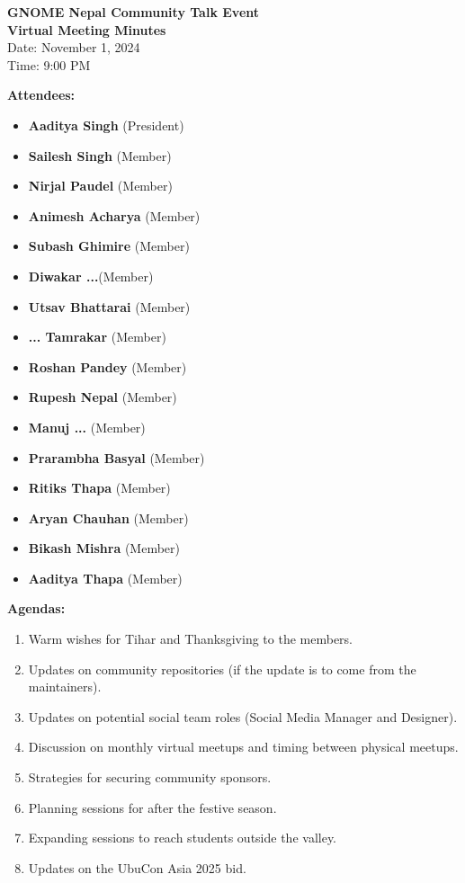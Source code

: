 \documentclass[a4paper,11pt]{article}
\begin{document}
\begin{center}
    \textbf{\Large GNOME Nepal Community Talk Event} \\[0.2cm]
    \textbf{Virtual Meeting Minutes} \\[0.2cm]
    Date: November 1, 2024 \\
    Time: 9:00 PM \\
\end{center}

\vspace{0.5cm}

\noindent\textbf{Attendees:}
\begin{itemize}
    \item \textbf{Aaditya Singh} (President)
    \item \textbf{Sailesh Singh} (Member)
    \item \textbf{Nirjal Paudel} (Member)
    \item \textbf{Animesh Acharya} (Member)
    \item \textbf{Subash Ghimire} (Member)
    \item \textbf{Diwakar ...}(Member)
    \item \textbf{Utsav Bhattarai} (Member)
    \item \textbf{... Tamrakar} (Member)
    \item \textbf{Roshan Pandey} (Member)
    \item \textbf{Rupesh Nepal} (Member)
    \item \textbf{Manuj ...} (Member)
    \item \textbf {Prarambha Basyal} (Member)
    \item \textbf{Ritiks Thapa} (Member)
    \item \textbf{Aryan Chauhan} (Member)
    \item \textbf{Bikash Mishra} (Member)
    \item \textbf{Aaditya Thapa} (Member)
\end{itemize}

\vspace{0.5cm}

\noindent\textbf{Agendas:}
\begin{enumerate}[label=\arabic*.]
    \item Warm wishes for Tihar and Thanksgiving to the members.
    \item Updates on community repositories (if the update is to come from the maintainers).
    \item Updates on potential social team roles (Social Media Manager and Designer).
    \item Discussion on monthly virtual meetups and timing between physical meetups.
    \item Strategies for securing community sponsors.
    \item Planning sessions for after the festive season.
    \item Expanding sessions to reach students outside the valley.
    \item Updates on the UbuCon Asia 2025 bid.
\end{enumerate}
\end{document}

